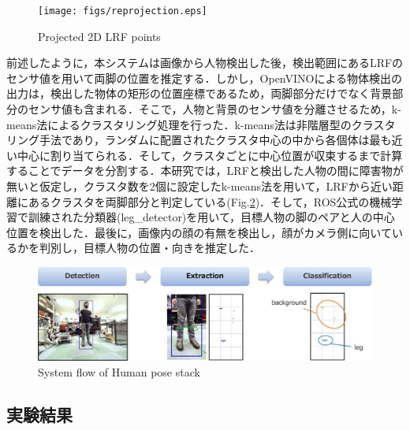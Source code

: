 \documentclass[12pt]{sonota/aislab}
\begin{document}
\begin{figure}[t]
\begin{center}
\texttt{[image: figs/reprojection.eps]}
\caption{Projected 2D LRF points}
\label{reprojection}
\end{center}
\end{figure}

前述したように，本システムは画像から人物検出した後，検出範囲にあるLRFのセンサ値を用いて両脚の位置を推定する．しかし，OpenVINOによる物体検出の出力は，検出した物体の矩形の位置座標であるため，両脚部分だけでなく背景部分のセンサ値も含まれる．そこで，人物と背景のセンサ値を分離させるため，k-means法によるクラスタリング処理を行った．k-means法は非階層型のクラスタリング手法であり，ランダムに配置されたクラスタ中心の中から各個体は最も近い中心に割り当てられる．そして，クラスタごとに中心位置が収束するまで計算することでデータを分割する．本研究では，LRFと検出した人物の間に障害物が無いと仮定し，クラスタ数を2個に設定したk-means法を用いて，LRFから近い距離にあるクラスタを両脚部分と判定している(Fig.\ref{human_lidar_flow})．そして，ROS公式の機械学習で訓練された分類器(leg\_detector)を用いて，目標人物の脚のペアと人の中心位置を検出した．最後に，画像内の顔の有無を検出し，顔がカメラ側に向いているかを判別し，目標人物の位置・向きを推定した．

\begin{figure}[t]
\begin{center}
\includegraphics[clip, width=13cm]{figs/human_lidar_flow.eps}
\caption{System flow of Human pose stack}
\label{human_lidar_flow}
\end{center}
\end{figure}

\subsection{実験結果}
\end{document}
